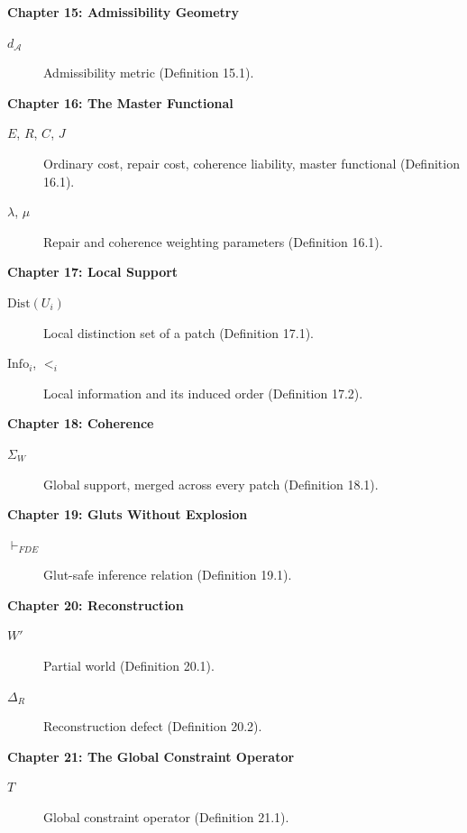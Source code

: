 \documentclass[11pt]{book}
\begin{document}
\noindent\textbf{Chapter 15: Admissibility Geometry}
\begin{description}
\item[$d_{\mathcal A}$] Admissibility metric (Definition 15.1).
\end{description}

\noindent\textbf{Chapter 16: The Master Functional}
\begin{description}
\item[$E$, $R$, $C$, $J$] Ordinary cost, repair cost, coherence liability, master functional (Definition 16.1).
\item[$\lambda$, $\mu$] Repair and coherence weighting parameters (Definition 16.1).
\end{description}

\noindent\textbf{Chapter 17: Local Support}
\begin{description}
\item[$\mathrm{Dist}(U_i)$] Local distinction set of a patch (Definition 17.1).
\item[$\mathrm{Info}_i$, $<_i$] Local information and its induced order (Definition 17.2).
\end{description}

\noindent\textbf{Chapter 18: Coherence}
\begin{description}
\item[$\Sigma_W$] Global support, merged across every patch (Definition 18.1).
\end{description}

\noindent\textbf{Chapter 19: Gluts Without Explosion}
\begin{description}
\item[$\vdash_{FDE}$] Glut-safe inference relation (Definition 19.1).
\end{description}

\noindent\textbf{Chapter 20: Reconstruction}
\begin{description}
\item[$W'$] Partial world (Definition 20.1).
\item[$\Delta_R$] Reconstruction defect (Definition 20.2).
\end{description}

\noindent\textbf{Chapter 21: The Global Constraint Operator}
\begin{description}
\item[$T$] Global constraint operator (Definition 21.1).
\end{description}
\end{document}
